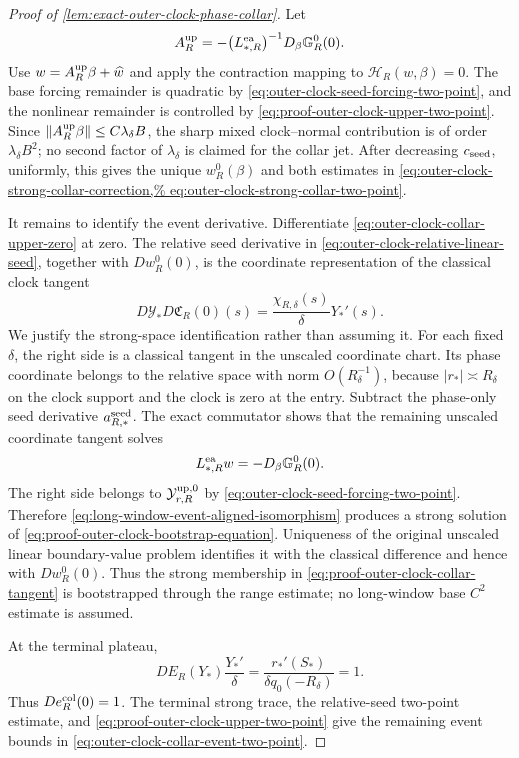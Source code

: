 \begin{proof}[Proof of
\cref{lem:exact-outer-clock-phase-collar}]
Let
\[
 A_R^{\rm up}
 =-\bigl(L_{*,R}^{\rm ea}\bigr)^{-1}
       D_\beta\mathbb G_R^0(0).
\]
Use \(w=A_R^{\rm up}\beta+\widehat w\) and apply the contraction mapping
to \(\mathcal H_R(w,\beta)=0\).  The base forcing remainder is quadratic
by \cref{eq:outer-clock-seed-forcing-two-point}, and the nonlinear
remainder is controlled by
\cref{eq:proof-outer-clock-upper-two-point}.  Since
\(\|A_R^{\rm up}\beta\|\le C\lambda_\delta B\), the sharp mixed
clock--normal contribution is of order
\(\lambda_\delta B^2\); no second factor of \(\lambda_\delta\) is
claimed for the collar jet.  After decreasing
\(c_{\rm seed}\), uniformly, this gives the unique
\(w_R^0(\beta)\) and both estimates in
\cref{eq:outer-clock-strong-collar-correction,%
eq:outer-clock-strong-collar-two-point}.

It remains to identify the event derivative.  Differentiate
\cref{eq:outer-clock-collar-upper-zero} at zero.  The relative seed
derivative in
\cref{eq:outer-clock-relative-linear-seed}, together with
\(Dw_R^0(0)\), is the coordinate representation of the classical clock
tangent
\begin{equation}
 D\mathcal Y_*
   D\mathfrak C_R(0)(s)
 =\frac{\chi_{R,\delta}(s)}{\delta}Y_*'(s).      \label{eq:proof-outer-clock-collar-tangent}
\end{equation}
We justify the strong-space identification rather than assuming it.
For each fixed \(\delta\), the right side is a classical tangent in the
unscaled coordinate chart.  Its phase coordinate belongs to the relative
space with norm \(O(R_\delta^{-1})\), because
\(|r_*|\asymp R_\delta\) on the clock support and the clock is zero at
the entry.  Subtract the phase-only seed derivative
\(a_{R,*}^{\rm seed}\).  The exact commutator shows that the remaining
unscaled coordinate tangent solves
\begin{equation}
 L_{*,R}^{\rm ea}w=-D_\beta\mathbb G_R^0(0).     \label{eq:proof-outer-clock-bootstrap-equation}
\end{equation}
The right side belongs to
\(\mathcal Y_{r,R}^{\rm up,0}\) by
\cref{eq:outer-clock-seed-forcing-two-point}.  Therefore
\cref{eq:long-window-event-aligned-isomorphism} produces a strong
solution of \cref{eq:proof-outer-clock-bootstrap-equation}.  Uniqueness
of the original unscaled linear boundary-value problem identifies it
with the classical difference and hence with \(Dw_R^0(0)\).  Thus the
strong membership in
\cref{eq:proof-outer-clock-collar-tangent} is bootstrapped through the
range estimate; no long-window base \(C^2\) estimate is assumed.

At the terminal
plateau,
\[
 DE_R(Y_*)\frac{Y_*'}{\delta}
 =\frac{r_*'(S_*)}{\delta q_0(-R_\delta)}=1.
\]
Thus \(D e_R^{\rm col}(0)=1\).  The terminal strong trace, the
relative-seed two-point estimate, and
\cref{eq:proof-outer-clock-upper-two-point} give the remaining event
bounds in \cref{eq:outer-clock-collar-event-two-point}.
\end{proof}


